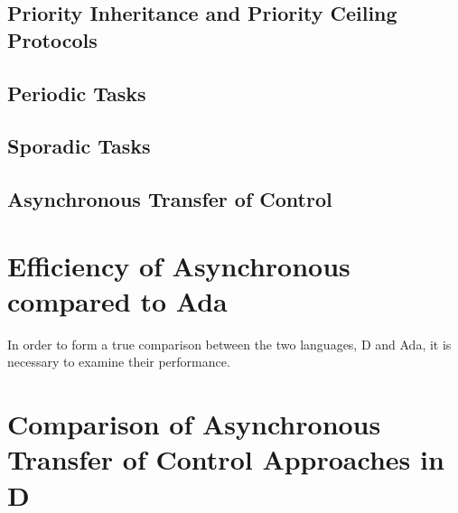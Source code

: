 \subsection{Priority Inheritance and Priority Ceiling Protocols}

\subsection{Periodic Tasks}

\subsection{Sporadic Tasks}

\subsection{Asynchronous Transfer of Control}

\section{Efficiency of Asynchronous compared to Ada}
In order to form a true comparison between the two languages, D and Ada, it is
necessary to examine their performance.

\section{Comparison of Asynchronous Transfer of Control Approaches in D}
